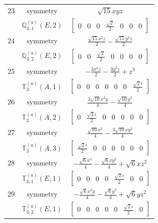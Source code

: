 \documentclass[fleqn,8pt,landscape]{jsarticle}
\begin{document}
\begin{longtable}{ccc}
$ 23 $ & $ \text{symmetry} $ & $ \sqrt{15} x y z $ \\
$  $ & $ \mathbb{Q}_{3,1}^{(a)}(E,2) $ & $ \begin{bmatrix} 0 & 0 & 0 & \frac{\sqrt{2}}{2} & 0 & 0 & 0 \end{bmatrix} $ \\ \hline
$ 24 $ & $ \text{symmetry} $ & $ \frac{\sqrt{15} x^{2} z}{2} - \frac{\sqrt{15} y^{2} z}{2} $ \\
$  $ & $ \mathbb{Q}_{3,2}^{(a)}(E,2) $ & $ \begin{bmatrix} 0 & 0 & \frac{\sqrt{2}}{2} & 0 & 0 & 0 & 0 \end{bmatrix} $ \\ \hline
$ 25 $ & $ \text{symmetry} $ & $ - \frac{3 x^{2} z}{2} - \frac{3 y^{2} z}{2} + z^{3} $ \\
$  $ & $ \mathbb{T}_{3}^{(a)}(A,1) $ & $ \begin{bmatrix} 0 & 0 & 0 & 0 & 0 & 0 & \frac{\sqrt{2} i}{2} \end{bmatrix} $ \\ \hline
$ 26 $ & $ \text{symmetry} $ & $ \frac{3 \sqrt{10} x^{2} y}{4} - \frac{\sqrt{10} y^{3}}{4} $ \\
$  $ & $ \mathbb{T}_{3}^{(a)}(A,2) $ & $ \begin{bmatrix} 0 & \frac{\sqrt{2} i}{2} & 0 & 0 & 0 & 0 & 0 \end{bmatrix} $ \\ \hline
$ 27 $ & $ \text{symmetry} $ & $ \frac{\sqrt{10} x^{3}}{4} - \frac{3 \sqrt{10} x y^{2}}{4} $ \\
$  $ & $ \mathbb{T}_{3}^{(a)}(A,3) $ & $ \begin{bmatrix} \frac{\sqrt{2} i}{2} & 0 & 0 & 0 & 0 & 0 & 0 \end{bmatrix} $ \\ \hline
$ 28 $ & $ \text{symmetry} $ & $ - \frac{\sqrt{6} x^{3}}{4} - \frac{\sqrt{6} x y^{2}}{4} + \sqrt{6} x z^{2} $ \\
$  $ & $ \mathbb{T}_{3,1}^{(a)}(E,1) $ & $ \begin{bmatrix} 0 & 0 & 0 & 0 & \frac{\sqrt{2} i}{2} & 0 & 0 \end{bmatrix} $ \\ \hline
$ 29 $ & $ \text{symmetry} $ & $ - \frac{\sqrt{6} x^{2} y}{4} - \frac{\sqrt{6} y^{3}}{4} + \sqrt{6} y z^{2} $ \\
$  $ & $ \mathbb{T}_{3,2}^{(a)}(E,1) $ & $ \begin{bmatrix} 0 & 0 & 0 & 0 & 0 & \frac{\sqrt{2} i}{2} & 0 \end{bmatrix} $ \\ \hline

\end{longtable}
\end{document}
